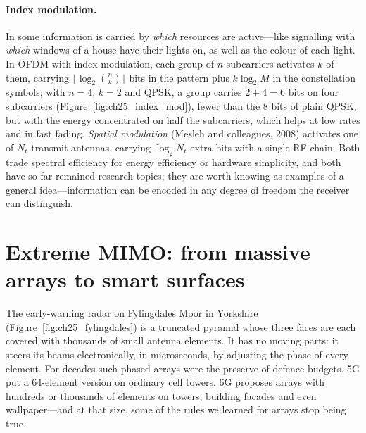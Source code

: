 \paragraph{Index modulation.} In  some information is carried by \emph{which}
resources are active---like signalling with \emph{which} windows of a house have their lights on, as
well as the colour of each light. In OFDM with index modulation, each group of $n$ subcarriers
activates $k$ of them, carrying $\lfloor\log_2\binom{n}{k}\rfloor$ bits in the pattern plus $k\log_2M$
in the constellation symbols; with $n=4$, $k=2$ and QPSK, a group carries $2+4=6$ bits on four
subcarriers (Figure~\ref{fig:ch25_index_mod}), fewer than the 8 bits of plain QPSK, but with the energy
concentrated on half the subcarriers, which helps at low rates and in fast fading. \emph{Spatial
modulation} (Mesleh and colleagues, 2008) activates one of $N_t$ transmit antennas, carrying
$\log_2N_t$ extra bits with a single RF chain. Both trade spectral efficiency for energy efficiency or
hardware simplicity, and both have so far remained research topics; they are worth knowing as
examples of a general idea---information can be encoded in any degree of freedom the receiver can
distinguish.

\section{Extreme MIMO: from massive arrays to smart surfaces}
\label{sec:ch25:mimo}

The early-warning radar on Fylingdales Moor in Yorkshire (Figure~\ref{fig:ch25_fylingdales}) is a
truncated pyramid whose three faces are each covered with thousands of small antenna elements. It
has no moving parts: it steers its beams electronically, in microseconds, by adjusting the phase of
every element. For decades such phased arrays were the preserve of defence budgets. 5G put a
64-element version on ordinary cell towers. 6G proposes arrays with hundreds or thousands of
elements on towers, building facades and even wallpaper---and at that size, some of the rules we
learned for arrays stop being true.


